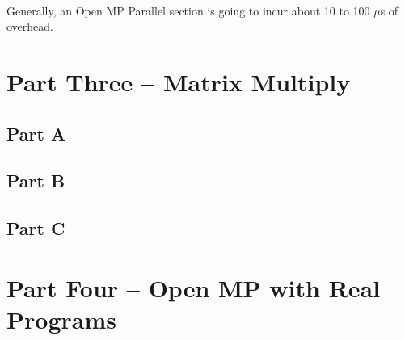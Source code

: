 \documentclass[12pt,8.5in,11in]{article}
\begin{document}
\paragraph{}
Generally, an Open MP Parallel section is going to incur about 10 to 100 $\mu$s of overhead.

\section{Part Three -- Matrix Multiply}

	\subsection{Part A}
	
	\subsection{Part B}
	
	\subsection{Part C}
	
\section{Part Four -- Open MP with Real Programs}	
	
\end{document}
